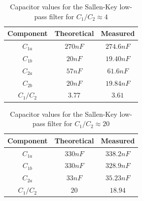 \documentclass{scrartcl}
\begin{document}
\begin{table}[H]
    \centering
    \begin{tabular}{|c|c|c|} \hline
        \textbf{Component} & \textbf{Theoretical} & \textbf{Measured} \\ \hline
        $C_{1a}$ & $270nF$ & $274.6nF$ \\ \hline 
        $C_{1b}$ & $20nF$ & $19.40nF$ \\ \hline
		$C_{2a}$ & $57nF$ & $61.6nF$ \\ \hline
		$C_{2b}$ & $20nF$ & $19.84nF$ \\ \hline
		$C_1/C_2$ & $3.77$ & $3.61$ \\ \hline
    \end{tabular}
    \caption{Capacitor values for the Sallen-Key low-pass filter for $C_1/C_2 \approx 4$}
    \label{sallen_component_values_4}
\end{table}

\begin{table}[H]
    \centering
    \begin{tabular}{|c|c|c|} \hline
        \textbf{Component} & \textbf{Theoretical} & \textbf{Measured} \\ \hline
        $C_{1a}$ & $330nF$ & $338.2nF$ \\ \hline 
        $C_{1b}$ & $330nF$ & $328.9nF$ \\ \hline
		$C_{2a}$ & $33nF$ & $35.23nF$ \\ \hline
		$C_1/C_2$ & $20$ & $18.94$ \\ \hline
    \end{tabular}
    \caption{Capacitor values for the Sallen-Key low-pass filter for $C_1/C_2 \approx 20$}
    \label{sallen_component_values_20}
\end{table}


\newpage
\end{document}
